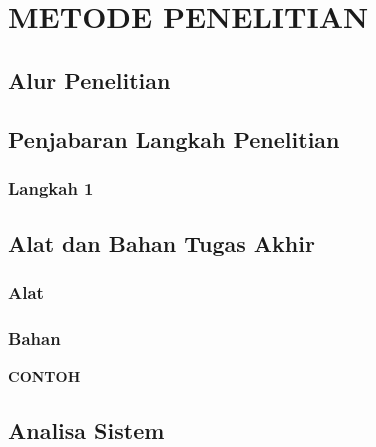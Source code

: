 \chapter{METODE PENELITIAN}

%
\vspace{4.5pt}

\begin{flushleft}
   \section{Alur Penelitian}

   \section{Penjabaran Langkah Penelitian}
   \subsection{Langkah 1}

   \section{Alat dan Bahan Tugas Akhir}
   \subsection{Alat}
   \subsection{Bahan}
\end{flushleft}

\vspace{5cm}
\noindent \textbf{CONTOH}
\section{Analisa Sistem}

